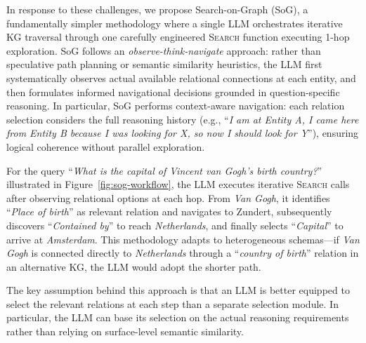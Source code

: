 \documentclass[sigconf]{acmart}
\begin{document}
In response to these challenges, we propose Search-on-Graph (SoG), a fundamentally simpler methodology where a single LLM orchestrates iterative KG traversal through one carefully engineered \textsc{Search} function executing 1-hop exploration. SoG follows an \textit{observe-think-navigate} approach: rather than speculative path planning or semantic similarity heuristics, the LLM first systematically observes actual available relational connections at each entity, and then formulates informed navigational decisions grounded in question-specific reasoning. In particular, SoG performs context-aware navigation: each relation selection considers the full reasoning history (e.g., ``\textit{I am at Entity A, I came here from Entity B because I was looking for X, so now I should look for Y}''), ensuring logical coherence without parallel exploration.

For the query ``\textit{What is the capital of Vincent van Gogh's birth country?}'' illustrated in Figure~\ref{fig:sog-workflow}, the LLM executes iterative \textsc{Search} calls after observing relational options at each hop. From \textit{Van Gogh}, it identifies ``\textit{Place of birth}'' as relevant relation and navigates to Zundert, subsequently discovers ``\textit{Contained by}'' to reach \textit{Netherlands}, and finally selects ``\textit{Capital}'' to arrive at \textit{Amsterdam}. This methodology adapts to heterogeneous schemas---if \textit{Van Gogh} is connected directly to \textit{Netherlands} through a ``\textit{country of birth}'' relation in an alternative KG, the LLM would adopt the shorter path. %

The key assumption behind this approach is that an LLM is better equipped to select the relevant relations at each step than a separate selection module. In particular, the LLM can base its selection on the actual reasoning requirements rather than relying on surface-level semantic similarity.
\end{document}
